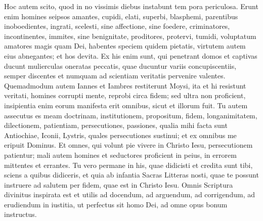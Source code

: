 \begin{biblechapter}
\begin{biblechapter}
\begin{biblechapter}
\verse Hoc autem scito, quod in no vissimis diebus instabunt tem pora periculosa. 
\verse Erunt enim homines seipsos amantes, cupidi, elati, superbi, blasphemi, parentibus inoboedientes, ingrati, scelesti, 
\verse sine affectione, sine foedere, criminatores, incontinentes, immites, sine benignitate, 
\verse proditores, protervi, tumidi, voluptatum amatores magis quam Dei, 
\verse habentes speciem quidem pietatis, virtutem autem eius abnegantes; et hos devita. 
\verse Ex his enim sunt, qui penetrant domos et captivas ducunt mulierculas oneratas peccatis, quae ducuntur variis concupiscentiis, 
\verse semper discentes et numquam ad scientiam veritatis pervenire valentes. 
\verse Quemadmodum autem Iannes et Iambres restiterunt Moysi, ita et hi resistunt veritati, homines corrupti mente, reprobi circa fidem; 
\verse sed ultra non proficient, insipientia enim eorum manifesta erit omnibus, sicut et illorum fuit.
 \verse Tu autem assecutus es meam doctrinam, institutionem, propositum, fidem, longanimitatem, dilectionem, patientiam, 
\verse persecutiones, passiones, qualia mihi facta sunt Antiochiae, Iconii, Lystris, quales persecutiones sustinui; et ex omnibus me eripuit Dominus. 
\verse Et omnes, qui volunt pie vivere in Christo Iesu, persecutionem patientur; 
\verse mali autem homines et seductores proficient in peius, in errorem mittentes et errantes.
 \verse Tu vero permane in his, quae didicisti et credita sunt tibi, sciens a quibus didiceris, 
\verse et quia ab infantia Sacras Litteras nosti, quae te possunt instruere ad salutem per fidem, quae est in Christo Iesu. 
\verse Omnis Scriptura divinitus inspirata est et utilis ad docendum, ad arguendum, ad corrigendum, ad erudiendum in iustitia, 
\verse ut perfectus sit homo Dei, ad omne opus bonum instructus.
 

\end{biblechapter}
\end{biblechapter}
\end{biblechapter}

